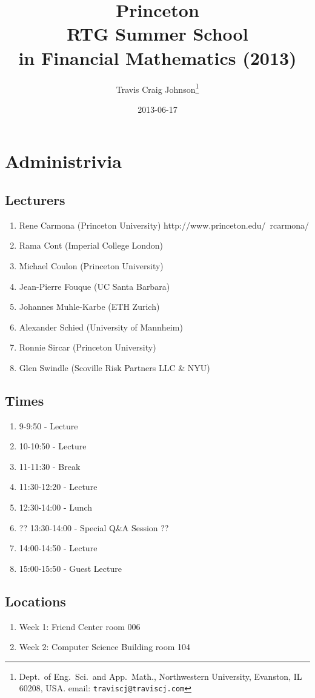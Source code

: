 \documentclass[twocolumn,openany]{book}
\title{Princeton \\ RTG Summer School \\in Financial Mathematics (2013)}
\author{ Travis Craig Johnson\thanks{Dept.~of Eng.~Sci.~and App.~Math., Northwestern University, Evanston, IL 60208, USA. email: \texttt{traviscj@traviscj.com}}}
\date{2013-06-17}
\begin{document}
\ifpdf
{}
\else
{}
\fi

\maketitle

\chapter{Administrivia}
\section{Lecturers}
\begin{enumerate}
	\item Rene Carmona (Princeton University) http://www.princeton.edu/~rcarmona/
	\item Rama Cont (Imperial College London)
	\item Michael Coulon (Princeton University)
	\item Jean-Pierre Fouque (UC Santa Barbara)
	\item Johannes Muhle-Karbe (ETH Zurich)
	\item Alexander Schied (University of Mannheim)
	\item Ronnie Sircar (Princeton University)
	\item Glen Swindle (Scoville Risk Partners LLC \& NYU)
\end{enumerate}
\section{Times}
\begin{enumerate}
	\item 9-9:50 - Lecture
	\item 10-10:50 - Lecture
	\item 11-11:30 - Break
	\item 11:30-12:20 - Lecture
	\item 12:30-14:00 - Lunch
	\item ?? 13:30-14:00 - Special Q\&A Session ??
	\item 14:00-14:50 - Lecture
	\item 15:00-15:50 - Guest Lecture
\end{enumerate}

\section{Locations}
\begin{enumerate}
	\item Week 1: Friend Center room 006
	\item Week 2: Computer Science Building room 104
\end{enumerate}
\end{document}
